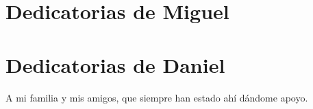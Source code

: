 \chapter*{Dedicatorias de Miguel}

\chapter*{Dedicatorias de Daniel}
A mi familia y mis amigos, que siempre
han estado ahí dándome apoyo.
